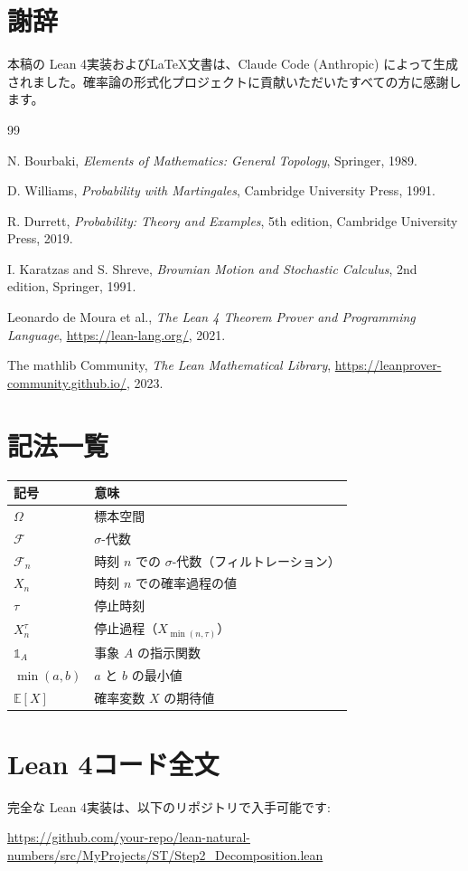 \documentclass[a4paper,12pt]{ltjsarticle}
\theoremstyle{definition}
\begin{document}
\section*{謝辞}

本稿の Lean 4実装および\LaTeX 文書は、Claude Code (Anthropic) によって生成されました。確率論の形式化プロジェクトに貢献いただいたすべての方に感謝します。

\begin{thebibliography}{99}

N. Bourbaki, \textit{Elements of Mathematics: General Topology}, Springer, 1989.

D. Williams, \textit{Probability with Martingales}, Cambridge University Press, 1991.

R. Durrett, \textit{Probability: Theory and Examples}, 5th edition, Cambridge University Press, 2019.

I. Karatzas and S. Shreve, \textit{Brownian Motion and Stochastic Calculus}, 2nd edition, Springer, 1991.

Leonardo de Moura et al., \textit{The Lean 4 Theorem Prover and Programming Language}, \url{https://lean-lang.org/}, 2021.

The mathlib Community, \textit{The Lean Mathematical Library}, \url{https://leanprover-community.github.io/}, 2023.

\end{thebibliography}

\appendix

\section{記法一覧}

\begin{tabular}{ll}
\hline
記号 & 意味 \\
\hline
$\Omega$ & 標本空間 \\
$\mathcal{F}$ & $\sigma$-代数 \\
$\mathcal{F}_n$ & 時刻 $n$ での $\sigma$-代数（フィルトレーション）\\
$X_n$ & 時刻 $n$ での確率過程の値 \\
$\tau$ & 停止時刻 \\
$X^\tau_n$ & 停止過程（$X_{\min(n, \tau)}$）\\
$\mathbb{1}_A$ & 事象 $A$ の指示関数 \\
$\min(a, b)$ & $a$ と $b$ の最小値 \\
$\mathbb{E}[X]$ & 確率変数 $X$ の期待値 \\
\hline
\end{tabular}

\section{Lean 4コード全文}

完全な Lean 4実装は、以下のリポジトリで入手可能です:
\begin{center}
\url{https://github.com/your-repo/lean-natural-numbers/src/MyProjects/ST/Step2_Decomposition.lean}
\end{center}
\end{document}

